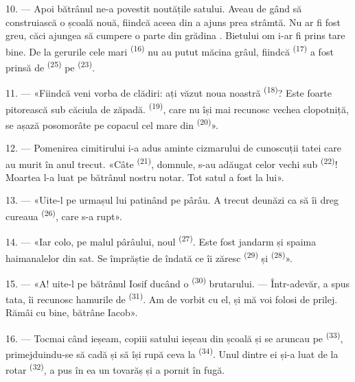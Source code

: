 10. --- Apoi bătrânul ne-a povestit noutățile satului. Aveau de gând să
construiască o școală nouă, fiindcă aceea din  a ajuns prea
strâmtă. Nu ar fi fost greu, căci ajungea să cumpere o parte din grădina
. Bietului om i-ar fi prins tare bine. De la gerurile cele mari
  \textsuperscript{(16)} nu au putut măcina grâul,
fiindcă  \textsuperscript{(17)} a fost prinsă de 
\textsuperscript{(25)} pe  \textsuperscript{(23)}.

11. --- «Fiindcă veni vorba de clădiri: ați văzut noua noastră 
\textsuperscript{(18)}? Este foarte pitorească sub căciula de zăpadă.
 \textsuperscript{(19)}, care nu își mai recunosc vechea
clopotniță, se așază posomorâte pe copacul cel mare din 
\textsuperscript{(20)}».

12. --- Pomenirea cimitirului i-a adus aminte cizmarului de cunoscuții tatei care
au murit în anul trecut. «Câte  \textsuperscript{(21)}, domnule,
s-au adăugat celor vechi sub  \textsuperscript{(22)}! Moartea l-a
luat pe bătrânul nostru notar. Tot satul a fost la  lui».

13. --- «Uite-l pe urmașul lui patinând pe pârâu. A trecut deunăzi ca să îi dreg
cureaua  \textsuperscript{(26)}, care s-a rupt».

14. --- «Iar colo, pe malul pârâului, noul 
\textsuperscript{(27)}. Este fost jandarm și spaima haimanalelor din sat. Se
împrăștie de îndată ce îi zăresc  \textsuperscript{(29)} și
 \textsuperscript{(28)}».

15. --- «A! uite-l pe bătrânul Iosif ducând o 
\textsuperscript{(30)} brutarului. --- Într-adevăr, a spus tata, îi recunosc
hamurile de  \textsuperscript{(31)}. Am de vorbit cu el, și mă voi
folosi de prilej. Rămâi cu bine, bătrâne Iacob».

16. --- Tocmai când ieșeam, copiii satului ieșeau din școală și se aruncau pe
 \textsuperscript{(33)}, primejduindu-se să cadă și să își rupă
ceva la  \textsuperscript{(34)}. Unul dintre ei și-a luat de la
rotar  \textsuperscript{(32)}, a pus în ea un tovarăș și a pornit în
fugă.

